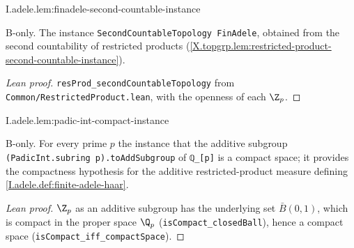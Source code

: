 \begin{lemma}
\bonly
{}
\end{lemma}
\begin{tfformal}{I.adele.lem:finadele-second-countable-instance}
\begin{tffidelity}
B-only. The instance \texttt{SecondCountableTopology FinAdele}, obtained from the second countability of restricted products (\cref{X.topgrp.lem:restricted-product-second-countable-instance}).
\end{tffidelity}
\end{tfformal}
\begin{proof}[Lean proof]
\texttt{resProd\_secondCountableTopology} from \texttt{Common/RestrictedProduct.lean}, with the openness of each $\Z_p$.
\end{proof}

\begin{lemma}[$\Zp$ is compact]
\bonly
{}
\end{lemma}
\begin{tfformal}{I.adele.lem:padic-int-compact-instance}
\begin{tffidelity}
B-only. For every prime $p$ the instance that the additive subgroup \texttt{(PadicInt.subring p).toAddSubgroup} of \texttt{ℚ\_[p]} is a compact space; it provides the compactness hypothesis for the additive restricted-product measure defining \cref{I.adele.def:finite-adele-haar}.
\end{tffidelity}
\end{tfformal}
\begin{proof}[Lean proof]
$\Z_p$ as an additive subgroup has the underlying set $\bar B(0,1)$, which is compact in the proper space $\Q_p$ (\texttt{isCompact\_closedBall}), hence a compact space (\texttt{isCompact\_iff\_compactSpace}).
\end{proof}

